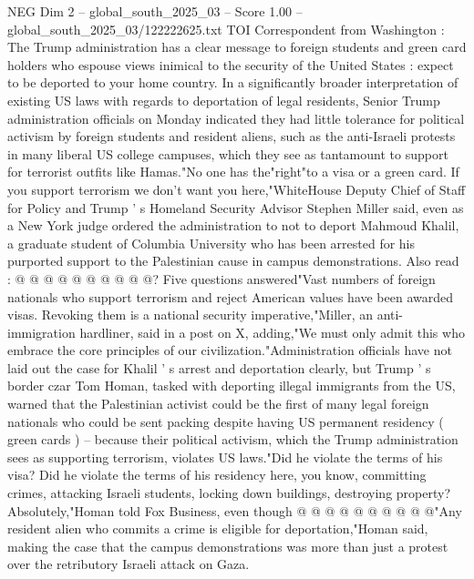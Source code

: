 \begin{textsample}{NEG Dim 2 – global\_south\_2025\_03 – Score 1.00 – global\_south\_2025\_03/122222625.txt}  \label{ex:f2_neg_148}
TOI Correspondent from Washington : The Trump administration has a clear message to foreign students and green card holders who espouse views inimical to the security of the United States : expect to be deported to your home country.
In a significantly broader interpretation of existing US laws with regards to deportation of legal residents, Senior Trump administration officials on Monday indicated they had little tolerance for political activism by foreign students and resident aliens, such as the anti-Israeli protests in many liberal US college campuses, which they see as tantamount to support for terrorist outfits like Hamas."No one has the"right"to a visa or a green card.
If you support terrorism we don't want you here,"WhiteHouse Deputy Chief of Staff for Policy and Trump ' s Homeland Security Advisor Stephen Miller said, even as a New York judge ordered the administration to not to deport Mahmoud Khalil, a graduate student of Columbia University who has been arrested for his purported support to the Palestinian cause in campus demonstrations.
Also read : @ @ @ @ @ @ @ @ @ @?
Five questions answered"Vast numbers of foreign nationals who support terrorism and reject American values have been awarded visas.
Revoking them is a national security imperative,"Miller, an anti-immigration hardliner, said in a post on X, adding,"We must only admit this who embrace the core principles of our civilization."Administration officials have not laid out the case for Khalil ' s arrest and deportation clearly, but Trump ' s border czar Tom Homan, tasked with deporting illegal immigrants from the US, warned that the Palestinian activist could be the first of many legal foreign nationals who could be sent packing despite having US permanent residency ( green cards ) -- because their political activism, which the Trump administration sees as supporting terrorism, violates US laws."Did he violate the terms of his visa?
Did he violate the terms of his residency here, you know, committing crimes, attacking Israeli students, locking down buildings, destroying property?
Absolutely,"Homan told Fox Business, even though @ @ @ @ @ @ @ @ @ @"Any resident alien who commits a crime is eligible for deportation,"Homan said, making the case that the campus demonstrations was more than just a protest over the retributory Israeli attack on Gaza.

\end{textsample}
